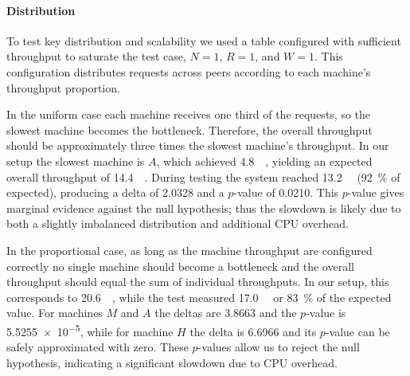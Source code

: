 
\paragraph{Distribution}
To test key distribution and scalability we used a table configured
with sufficient throughput to saturate the test case, $N=1$, $R=1$, and $W=1$.
This configuration distributes requests across peers according to each machine's throughput proportion.

In the uniform case each machine receives one third of the requests,
so the slowest machine becomes the bottleneck.
Therefore, the overall throughput should be approximately three times the slowest machine's throughput.
In our setup the slowest machine is $A$, which achieved \qty{4.8}{\kilo\rps},
yielding an expected overall throughput of \qty{14.4}{\kilo\rps}.
During testing the system reached \qty{13.2}{\kilo\rps} (\qty{92}{\percent} of expected),
producing a delta of \num{2.0328} and a $p$-value of \num{0.0210}.
This $p$-value gives marginal evidence against the null hypothesis;
thus the slowdown is likely due to both a slightly imbalanced distribution and additional CPU overhead.


In the proportional case, as long as the machine throughput are configured correctly no single machine should become a bottleneck
and the overall throughput should equal the sum of individual throughputs.
In our setup, this corresponds to \qty{20.6}{\kilo\rps},
while the test measured \qty{17.0}{\kilo\rps} or \qty{83}{\percent} of the expected value.
For machines $M$ and $A$ the deltas are \num{3.8663} and the $p$-value is \num{5.5255e-5},
while for machine $H$ the delta is \num{6.6966} and its $p$-value can be safely approximated with zero.
These $p$-values allow us to reject the null hypothesis,
indicating a significant slowdown due to CPU overhead.



